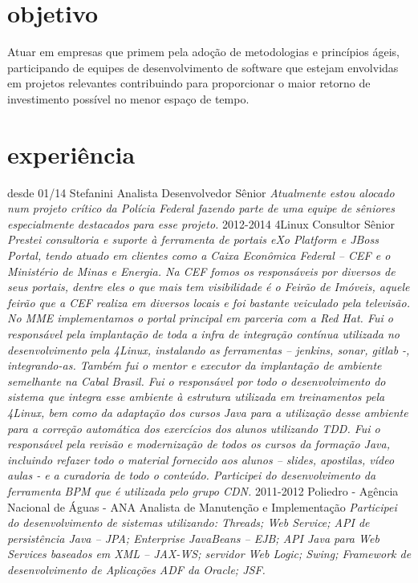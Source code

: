 \documentclass[]{friggeri-cv}
\begin{document}
\section{objetivo}

Atuar em empresas que primem pela adoção de metodologias e princípios ágeis, participando de equipes de desenvolvimento de software que estejam envolvidas em projetos relevantes contribuindo para proporcionar o maior retorno de investimento possível no menor espaço de tempo. 

\section{experiência}

\begin{entrylist}
  \entry
    {desde 01/14}
    {Stefanini}
    {Analista Desenvolvedor Sênior}
    {\emph{Atualmente estou alocado num projeto crítico da Polícia Federal fazendo parte de uma equipe de sêniores especialmente destacados para esse projeto.}}
  \entry
    {2012-2014}
    {4Linux}
    {Consultor Sênior}
    {\emph{Prestei consultoria e suporte à ferramenta de portais eXo Platform e JBoss Portal, tendo atuado em clientes como a Caixa Econômica Federal – CEF e o Ministério de Minas e Energia. Na CEF fomos os responsáveis por diversos de seus portais, dentre eles o que mais tem visibilidade é o Feirão de Imóveis, aquele feirão que a CEF realiza em diversos locais e foi bastante veiculado pela televisão. No MME implementamos o portal principal em parceria com a Red Hat.
Fui o responsável pela implantação de toda a infra de integração contínua utilizada no desenvolvimento pela 4Linux, instalando as ferramentas – jenkins, sonar, gitlab -, integrando-as.
Também fui o mentor e executor da implantação de ambiente semelhante na Cabal Brasil.
Fui o responsável por todo o desenvolvimento do sistema que integra esse ambiente à estrutura utilizada em treinamentos pela 4Linux, bem como da adaptação dos cursos Java para a utilização desse ambiente para a correção automática dos exercícios dos alunos utilizando TDD.
Fui o responsável pela revisão e modernização de todos os cursos da formação Java, incluindo refazer todo o material fornecido aos alunos – slides, apostilas, vídeo aulas - e a curadoria de todo o conteúdo.
Participei do desenvolvimento da ferramenta BPM que é utilizada pelo grupo CDN.}}
  \entry
    {2011-2012}
    {Poliedro - Agência Nacional de Águas - ANA}
    {Analista de Manutenção e Implementação}
    {\emph{Participei do desenvolvimento de sistemas utilizando: Threads; Web Service;  API de persistência Java – JPA; Enterprise JavaBeans – EJB; API Java para Web Services baseados em XML – JAX-WS; servidor Web Logic; Swing; Framework de desenvolvimento de Aplicações ADF da Oracle; JSF.}}

\end{entrylist}
\end{document}
